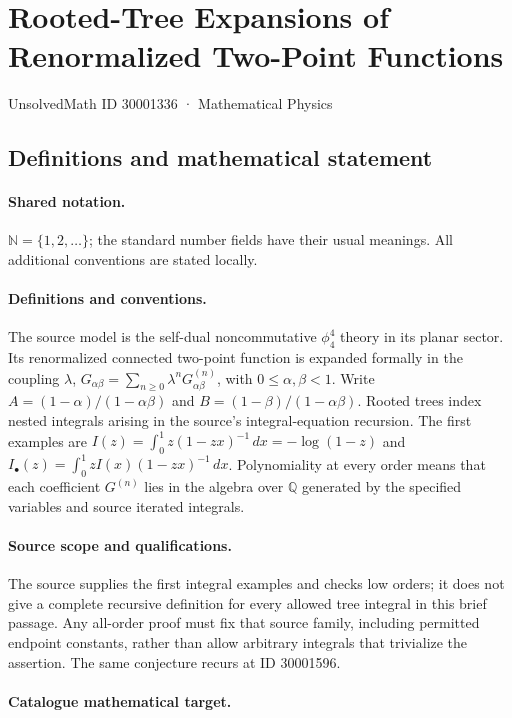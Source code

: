 \documentclass[11pt]{article}
\begin{document}
\setcounter{section}{30001335}
\section{Rooted-Tree Expansions of Renormalized Two-Point Functions}\label{30001336}
{\small UnsolvedMath ID 30001336 · Mathematical Physics}
\subsection{Definitions and mathematical statement}

\paragraph{Shared notation.}$\mathbb N=\{1,2,\ldots\}$; the standard number fields have their usual meanings. All additional conventions are stated locally.


\paragraph{Definitions and conventions.} The source model is the self-dual noncommutative $\phi^4_4$ theory in its planar sector. Its renormalized connected two-point function is expanded formally in the coupling $\lambda$, $G_{\alpha\beta}=\sum_{n\ge0}\lambda^nG^{(n)}_{\alpha\beta}$, with $0\le\alpha,\beta<1$. Write $A=(1-\alpha)/(1-\alpha\beta)$ and $B=(1-\beta)/(1-\alpha\beta)$. Rooted trees index nested integrals arising in the source's integral-equation recursion. The first examples are $I(z)=\int_0^1 z(1-zx)^{-1}\,dx=-\log(1-z)$ and $I_\bullet(z)=\int_0^1 zI(x)(1-zx)^{-1}\,dx$. Polynomiality at every order means that each coefficient $G^{(n)}$ lies in the algebra over $\mathbb Q$ generated by the specified variables and source iterated integrals.

\paragraph{Source scope and qualifications.} The source supplies the first integral examples and checks low orders; it does not give a complete recursive definition for every allowed tree integral in this brief passage. Any all-order proof must fix that source family, including permitted endpoint constants, rather than allow arbitrary integrals that trivialize the assertion. The same conjecture recurs at ID 30001596.

\paragraph{Catalogue mathematical target.}
\end{document}
